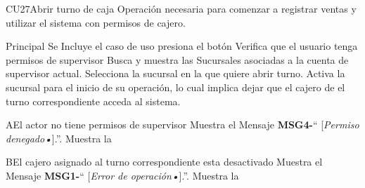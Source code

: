 \begin{UseCase}{CU27}{Abrir turno de caja}{
	Operación necesaria para comenzar a registrar ventas y 
	utilizar el sistema con permisos de cajero.
	}
	\end{UseCase}
	\begin{UCtrayectoria}{Principal}
		\UCpaso Se Incluye el caso de uso 
		\UCpaso presiona el botón 
		\UCpaso Verifica que el usuario tenga permisos de supervisor  
		\UCpaso Busca y muestra las Sucursales asociadas a la cuenta de supervisor actual.
		\UCpaso [\UCactor] Selecciona la sucursal en la que quiere abrir turno.
		\UCpaso Activa la sucursal para el inicio de su operación, lo cual implica dejar que el cajero de el turno correspondiente acceda al sistema. 
	\end{UCtrayectoria}

\begin{UCtrayectoriaA}{A}{El actor no tiene permisos de supervisor}
	\UCpaso Muestra el Mensaje {\bf MSG4-}`` [{\em Permiso denegado\textsl{•}}].''.
			\UCpaso Muestra la 
\end{UCtrayectoriaA}
\begin{UCtrayectoriaA}{B}{El cajero asignado al turno correspondiente esta desactivado}
	\UCpaso Muestra el Mensaje {\bf MSG1-}`` [{\em Error de operación\textsl{•}}].''.
			\UCpaso Muestra la 
\end{UCtrayectoriaA}
